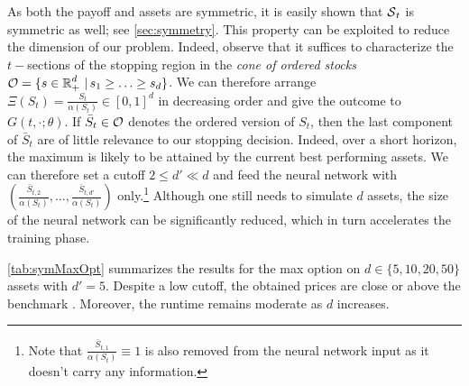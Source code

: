 As both the payoff and assets are symmetric, it is easily shown that  $\operatorname{\mathcal{S}}_t$ is symmetric as well; see \cref{sec:symmetry}. This property can be exploited to reduce the dimension of our problem. Indeed, observe that it suffices to characterize the $t-$sections of the stopping region in the \textit{cone of ordered stocks}  
 $\operatorname{\mathcal{O}} = \{s\in \operatorname{\mathbb{R}}_+^d \,|\, s_1 \geq \ldots \geq s_d\}$. We can therefore arrange $\Xi(S_t) = \frac{S_t}{\alpha(S_t)}\in [0,1]^d$ in decreasing order and give the outcome to $G(t,\cdot; \theta)$. If $\bar{S}_t \in \operatorname{\mathcal{O}}$ denotes the ordered version of $S_t$, then the last component of $\bar{S}_t$ are of little relevance to our stopping decision. 
 Indeed, over a short horizon, the maximum is  likely to be attained by the current best performing assets. %
 We can therefore set a cutoff $2 \le d' \ll d$ and feed the neural network with $(\frac{\bar{S}_{t,2}}{\alpha(S_t)},\ldots,\frac{\bar{S}_{t,d'}}{\alpha(S_t)})$ only.\footnote{Note that $\frac{\bar{S}_{t,1}}{\alpha(S_t)} \equiv 1$ is also removed from the neural network input as it doesn't carry any information.} Although one still needs to simulate $d$ assets, the size of the neural network can be significantly reduced, which in turn accelerates the training phase.  
 
 \cref{tab:symMaxOpt} summarizes the results for the max option on $d \in\{5,10,20,50\}$ assets with  $d'=5$. Despite a low cutoff, the  obtained prices are close or above the benchmark \cite{Becker2}. Moreover, the runtime remains moderate as $d$ increases. 

